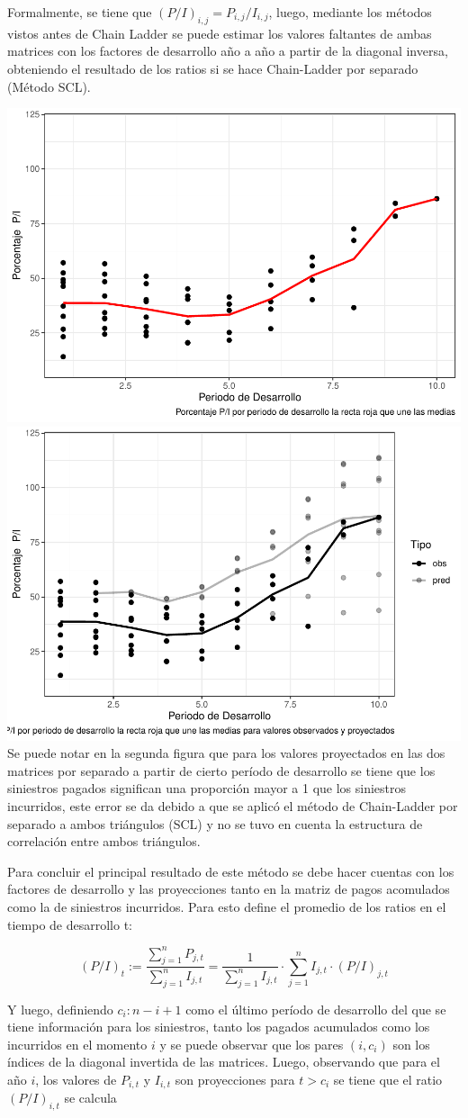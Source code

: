 \documentclass[
  12pt,
]{article}
\begin{document}
Formalmente, se tiene que \((P/I)_{i,j} = P_{i,j}/I_{i,j}\), luego,
mediante los métodos vistos antes de Chain Ladder se puede estimar los
valores faltantes de ambas matrices con los factores de desarrollo año a
año a partir de la diagonal inversa, obteniendo el resultado de los
ratios si se hace Chain-Ladder por separado (Método SCL).

\includegraphics[width=0.5\linewidth]{informe_files/figure-latex/unnamed-chunk-22-1}
\includegraphics[width=0.5\linewidth]{informe_files/figure-latex/unnamed-chunk-22-2}
Se puede notar en la segunda figura que para los valores proyectados en
las dos matrices por separado a partir de cierto período de desarrollo
se tiene que los siniestros pagados significan una proporción mayor a 1
que los siniestros incurridos, este error se da debido a que se aplicó
el método de Chain-Ladder por separado a ambos triángulos (SCL) y no se
tuvo en cuenta la estructura de correlación entre ambos triángulos.

Para concluir el principal resultado de este método se debe hacer
cuentas con los factores de desarrollo y las proyecciones tanto en la
matriz de pagos acomulados como la de siniestros incurridos. Para esto
define el promedio de los ratios en el tiempo de desarrollo t:

\[
(P/I)_t := \frac{\sum_{j=1}^n P_{j,t}}{\sum_{j=1}^n I_{j,t}} = \frac{1}{\sum_{j=1}^n I_{j,t}}\cdot \sum_{j=1}^n I_{j,t}\cdot (P/I)_{j,t}
\]

Y luego, definiendo \(c_i:n-i+1\) como el último período de desarrollo
del que se tiene información para los siniestros, tanto los pagados
acumulados como los incurridos en el momento \(i\) y se puede observar
que los pares \((i,c_i)\) son los índices de la diagonal invertida de
las matrices. Luego, observando que para el año \(i\), los valores de
\(P_{i,t}\) y \(I_{i,t}\) son proyecciones para \(t>c_i\) se tiene que
el ratio \((P/I)_{i,t}\) se calcula
\end{document}
